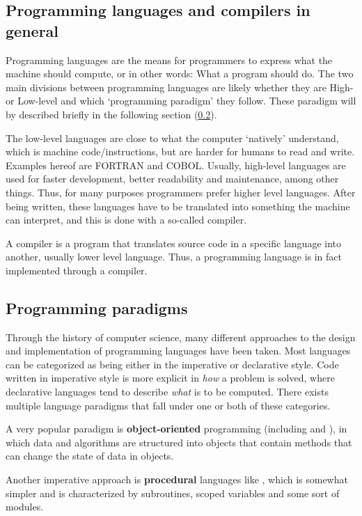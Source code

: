 
\subsection{Programming languages and compilers in general}
Programming languages are the means for programmers to express what the machine should compute, or in other words: What a program should do.
The two main divisions between programming languages are likely whether they are High- or Low-level and which `programming paradigm' they follow. These paradigm will by described briefly in the following section (\ref{sec:paradigms}).

The low-level languages are close to what the computer `natively' understand, which is machine code/instructions, but are harder for humans to read and write. Examples hereof are FORTRAN and COBOL. Usually, high-level languages are used for faster development, better readability and maintenance, among other things. Thus, for many purposes programmers prefer higher level languages. After being written, these languages have to be translated into something the machine can interpret, and this is done with a so-called compiler.

A compiler is a program that translates source code in a specific language into another, usually lower level language. Thus, a programming language is in fact implemented through a compiler.

\subsection{Programming paradigms}
\label{sec:paradigms}
Through the history of computer science, many different approaches to the design and implementation of programming languages have been taken. Most languages can be categorized as being either in the imperative or declarative style. Code written in imperative style is more explicit in \emph{how} a problem is solved, where declarative languages tend to describe \emph{what} is to be computed. There exists multiple language paradigms that fall under one or both of these categories.

A very popular paradigm is \textbf{object-oriented} programming (including  and ), in which data and algorithms are structured into objects that contain methods that can change the state of data in objects.

Another imperative approach is \textbf{procedural} languages like , which is somewhat simpler and is characterized by subroutines, scoped variables and some sort of modules.

